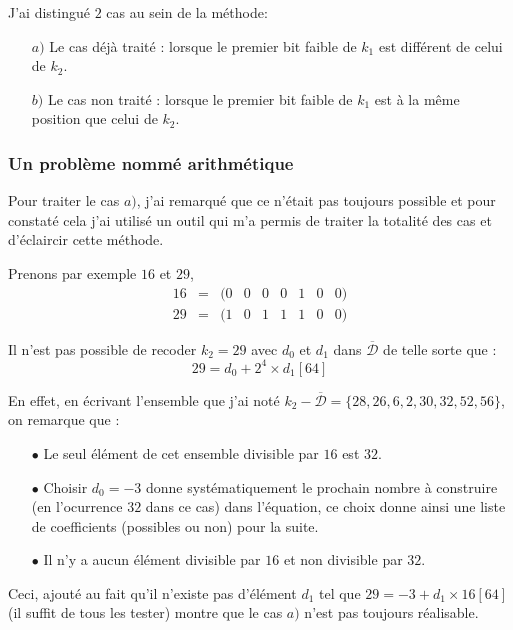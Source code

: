 \documentclass[12pt, a4paper]{memoir}
\newcommand{\dbarre}{\overline{\mathcal{D}}}
\begin{document}
 J'ai distingué $2$ cas au sein de la méthode:
 \begin{itemize}
  \item [$a)$] Le cas déjà traité : lorsque le premier bit faible de $k_1$ est différent de celui de $k_2$. \\
  \item [$b)$] Le cas non traité : lorsque le premier bit faible de $k_1$ est à la même position que celui de $k_2$.
  \end{itemize} 

 \subsubsection{Un problème nommé arithmétique}

 Pour traiter le cas $a)$, j'ai remarqué que ce n'était pas toujours possible et pour constaté cela j'ai utilisé un outil
 qui m'a permis de traiter la totalité des cas et d'éclaircir cette méthode.
 
 Prenons par exemple $16$ et $29$,
  $$\begin{array}{ccccccccc}
  16 & = & (0 & 0 & 0 & 0 & 1 & 0 & 0) \\
  29 & = & (1 & 0 & 1 & 1 & 1 & 0 & 0)
 \end{array}$$
 
 Il n'est pas possible de recoder $k_2 = 29$ avec $d_0$ et $d_1$ dans $\dbarre$ de telle sorte que :
 \begin{equation}
 29 = d_0 + 2^4 \times d_1 [64]
\end{equation}
 
 En effet, en écrivant l'ensemble que j'ai noté $k_2 - \dbarre = \{28,26,6,2,30,32,52,56\}$, on remarque que :
 \begin{itemize}
  \item [$\bullet$] Le seul élément de cet ensemble divisible par $16$ est $32$.
  \item [$\bullet$] Choisir $d_0 = -3$ donne systématiquement le prochain nombre à construire (en l'ocurrence $32$
  dans ce cas) dans l'équation, ce choix donne ainsi une liste de coefficients (possibles ou non) pour la suite. 
  \item [$\bullet$] Il n'y a aucun élément divisible par $16$ et non divisible par $32$.
 \end{itemize}

 Ceci, ajouté au fait qu'il n'existe pas d'élément $d_1$ tel que $29 = -3 + d_1 \times 16 [64]$ (il suffit de tous les tester) 
 montre que le cas $a)$ n'est pas toujours réalisable.
 
\end{document}
